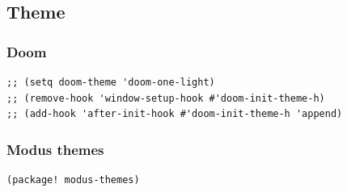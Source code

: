 \documentclass[11pt]{article}
\begin{document}
\subsection{Theme}
\label{sec:org780dd66}
\subsubsection{Doom}
\label{sec:org881cd66}
\begin{verbatim}
;; (setq doom-theme 'doom-one-light)
;; (remove-hook 'window-setup-hook #'doom-init-theme-h)
;; (add-hook 'after-init-hook #'doom-init-theme-h 'append)
\end{verbatim}

\subsubsection{Modus themes}
\label{sec:org1d184dc}
\begin{verbatim}
(package! modus-themes)
\end{verbatim}
\end{document}
